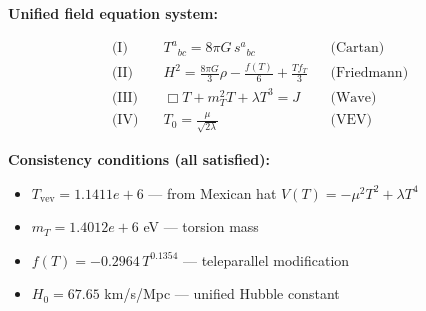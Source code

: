 
\textbf{Unified field equation system:}

\begin{align}
  \text{(I)} \quad & T^a{}_{bc} = 8\pi G \, s^a{}_{bc} && \text{(Cartan)} \\
  \text{(II)} \quad & H^2 = \frac{8\pi G}{3}\rho - \frac{f(T)}{6} + \frac{Tf_T}{3} && \text{(Friedmann)} \\
  \text{(III)} \quad & \Box T + m_T^2 T + \lambda T^3 = J && \text{(Wave)} \\
  \text{(IV)} \quad & T_0 = \frac{\mu}{\sqrt{2\lambda}} && \text{(VEV)}
\end{align}

\textbf{Consistency conditions (all satisfied):}
\begin{itemize}
  \item $T_{\text{vev}} = 1.1411e+6$ — from Mexican hat $V(T) = -\mu^2 T^2 + \lambda T^4$
  \item $m_T = 1.4012e+6$ eV — torsion mass
  \item $f(T) = -0.2964 \, T^{0.1354}$ — teleparallel modification
  \item $H_0 = 67.65$ km/s/Mpc — unified Hubble constant
\end{itemize}